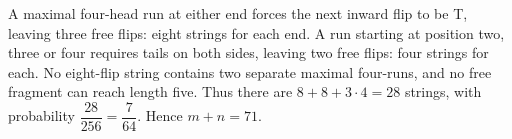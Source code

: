 A maximal four-head run at either end forces the next inward flip to be T, leaving three free flips: eight strings for each end. A run starting at position two, three or four requires tails on both sides, leaving two free flips: four strings for each. No eight-flip string contains two separate maximal four-runs, and no free fragment can reach length five. Thus there are $8+8+3\cdot4=28$ strings, with probability $\dfrac{28}{256}=\dfrac{7}{64}$. Hence $m+n=\boxed{71}$.
